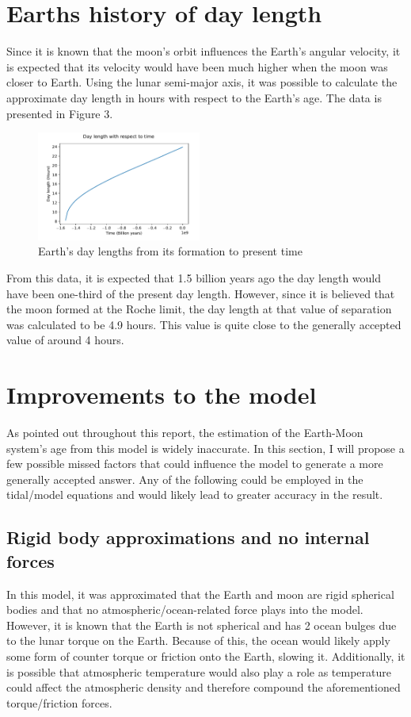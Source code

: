 \documentclass[final,5p,times,twocolumn,authoryear]{elsarticle}
\begin{document}
\section{Earths history of day length}

Since it is known that the moon's orbit influences the Earth's angular velocity, it is expected that its velocity would have been much higher when the moon was closer to Earth. Using the lunar semi-major axis, it was possible to calculate the approximate day length in hours with respect to the Earth's age. The data is presented in Figure 3. 

\begin{figure}[!h]
	\centering 
	\includegraphics[width=0.48\textwidth]{Day length.pdf}	
	\caption{Earth's day lengths from its formation to present time} 
\end{figure}

From this data, it is expected that 1.5 billion years ago the day length would have been one-third of the present day length. However, since it is believed that the moon formed at the Roche limit, the day length at that value of separation was calculated to be 4.9 hours. This value is quite close to the generally accepted value of around 4 hours. 

\section{Improvements to the model}

As pointed out throughout this report, the estimation of the Earth-Moon system's age from this model is widely inaccurate. In this section, I will propose a few possible missed factors that could influence the model to generate a more generally accepted answer. Any of the following could be employed in the tidal/model equations and would likely lead to greater accuracy in the result.  

\subsection{Rigid body approximations and no internal forces}
In this model, it was approximated that the Earth and moon are rigid spherical bodies and that no atmospheric/ocean-related force plays into the model. However, it is known that the Earth is not spherical and has 2 ocean bulges due to the lunar torque on the Earth. Because of this, the ocean would likely apply some form of counter torque or friction onto the Earth, slowing it. Additionally, it is possible that atmospheric temperature would also play a role as temperature could affect the atmospheric density and therefore compound the aforementioned torque/friction forces.
\end{document}

